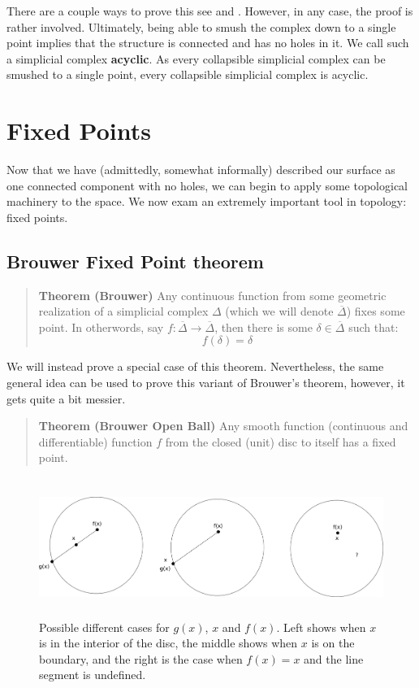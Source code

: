 \documentclass[a4paper]{article}
\newcommand{\ol}{\overline}
\begin{document}
There are a couple ways to prove this see \cite{easy} and \cite{lecs}. However, in any case, the proof is rather involved. Ultimately, being able to smush the complex down to a single point implies that the structure is connected and has no holes in it. We call such a simplicial complex \textbf{acyclic}. As every collapsible simplicial complex can be smushed to a single point, every collapsible simplicial complex is acyclic.

\section{Fixed Points}

Now that we have (admittedly, somewhat informally) described our surface as one connected component with no holes, we can begin to apply some topological machinery to the space. We now exam an extremely important tool in topology: fixed points.

\subsection{Brouwer Fixed Point theorem}

\begin{quote}
    \textbf{Theorem (Brouwer)} Any continuous function from some geometric realization of a simplicial complex $\Delta$ (which we will denote $\ol{\Delta}$) fixes some point. In otherwords, say $f : \ol{\Delta} \to \ol{\Delta}$, then there is some $\delta \in \ol{\Delta}$ such that:
    $$f(\delta) = \delta$$
\end{quote}

We will instead prove a special case of this theorem. Nevertheless, the same general idea can be used to prove this variant of Brouwer's theorem, however, it gets quite a bit messier.

\begin{quote}
    \textbf{Theorem (Brouwer Open Ball)} Any smooth function (continuous and differentiable) function $f$ from the closed (unit) disc to itself has a fixed point.
\end{quote}

\begin{figure}
\includegraphics[height=4.5cm]{fixedpoint}
\centering
\caption{Possible different cases for $g(x)$, $x$ and $f(x)$. Left shows when $x$ is in the interior of the disc, the middle shows when $x$ is on the boundary, and the right is the case when $f(x) = x$ and the line segment is undefined.}
\end{figure}
\end{document}
